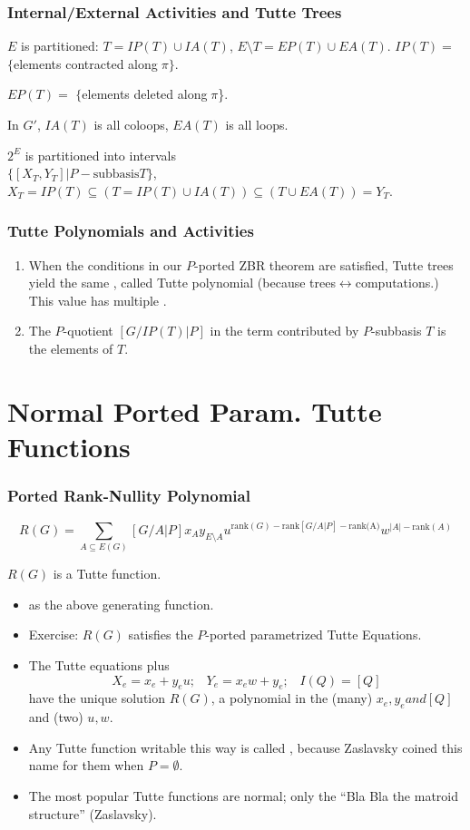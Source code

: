 \documentclass{beamer}
\begin{document}
\begin{frame}
\frametitle{Internal/External Activities and Tutte Trees}


$E$ is partitioned: $T=IP(T)\cup IA(T)$, 
$E\setminus T=EP(T)\cup EA(T)$.  $IP(T)=$ $\{$elements contracted 
along$\;\pi\}$.  

\vfill
$EP(T)=$ $\{$elements deleted along$\;\pi$\}.  

\vfill
In $G'$, $IA(T)$ is all coloops, $EA(T)$ is all loops.

\vfill
$2^E$ is partitioned into intervals \\
$\{[X_T,Y_T]|P-\text{subbasis} T\}$,\\
$X_T=IP(T)\subseteq (T=IP(T)\cup IA(T))\subseteq (T\cup EA(T))=Y_T$.

\end{frame}


\begin{frame}
\frametitle{Tutte Polynomials and Activities}
\begin{enumerate}
\item
When the conditions in our $P$-ported ZBR theorem are satisfied,
 Tutte trees yield the same ,
called  Tutte polynomial 
(because trees$\leftrightarrow$computations.)
This value has multiple .  
\item
The $P$-quotient $[G/IP(T)|P]$ in the term contributed by
$P$-subbasis $T$ is  the  elements of $T$.
\end{enumerate}
\end{frame}

\section{Normal Ported Param. Tutte Functions}
\begin{frame}
\frametitle{Ported Rank-Nullity Polynomial}
\[
R(G)=\sum_{A\subseteq E(G)}[G/A|P]x_A
                 y_{E\setminus A}
                 u^{\text{rank}(G)-\text{rank}[G/A|P]-\text{rank(A)}}
                 w^{|A|-\text{rank}(A)}
\]
\begin{block}{$R(G)$ is a Tutte function.}
\begin{itemize}
\item
{} as the above generating function.
\item
Exercise: $R(G)$ satisfies the $P$-ported parametrized Tutte Equations.
\item
The Tutte equations plus
\[
X_e=x_e+y_eu;\;\;\;Y_e=x_ew+y_e;\;\;\;I(Q)=[Q]
\]
have the unique solution $R(G)$, a polynomial
in the (many) $x_e, y_e and [Q]$ and (two) $u, w$.
\item
Any Tutte function writable this way is called 
, because Zaslavsky coined this
name for them when $P=\emptyset$.
\item
The most popular Tutte functions are normal;
only the ``Bla Bla the matroid structure''
(Zaslavsky).
\end{itemize}
\end{block}
\end{frame}
\end{document}
